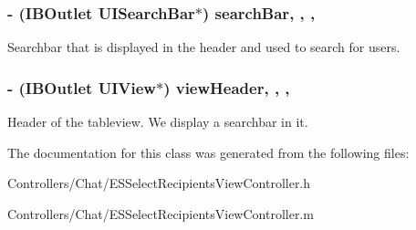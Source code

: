 \subsubsection[{search\+Bar}]{\setlength{\rightskip}{0pt plus 5cm}-\/ (I\+B\+Outlet U\+I\+Search\+Bar$\ast$) search\+Bar\hspace{0.3cm}{\ttfamily [read]}, {\ttfamily [write]}, {\ttfamily [nonatomic]}, {\ttfamily [strong]}}\label{interface_e_s_select_recipients_view_controller_a6add06c5397caab62ecd546794743aa8}
Searchbar that is displayed in the header and used to search for users. \hypertarget{interface_e_s_select_recipients_view_controller_a0e1cd5c8e4a2275f8f85653c07f7b99f}{}
\subsubsection[{view\+Header}]{\setlength{\rightskip}{0pt plus 5cm}-\/ (I\+B\+Outlet U\+I\+View$\ast$) view\+Header\hspace{0.3cm}{\ttfamily [read]}, {\ttfamily [write]}, {\ttfamily [nonatomic]}, {\ttfamily [strong]}}\label{interface_e_s_select_recipients_view_controller_a0e1cd5c8e4a2275f8f85653c07f7b99f}
Header of the tableview. We display a searchbar in it. 

The documentation for this class was generated from the following files\+:\begin{DoxyCompactItemize}
\item 
Controllers/\+Chat/E\+S\+Select\+Recipients\+View\+Controller.\+h\item 
Controllers/\+Chat/E\+S\+Select\+Recipients\+View\+Controller.\+m\end{DoxyCompactItemize}

